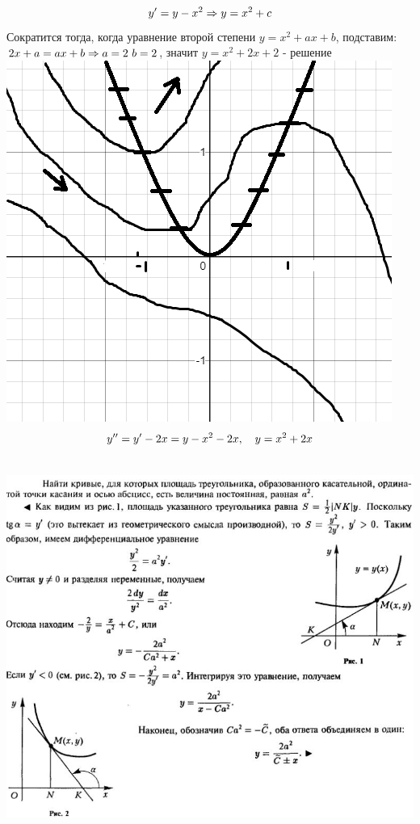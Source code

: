 \documentclass[12pt, fleqn]{article}
\begin{document}
    \begin{example}
        \[y'=y-x^2 \Rightarrow y=x^2+c\]
        Сократится тогда, когда уравнение второй степени $y=x^2+ax+b$, подставим: $2x+a=ax+b \Rightarrow a=2 \ b=2$, значит $y=x^2+2x+2$ - решение\\
        \includegraphics[scale=0.3]{pics/resh5.png}
        \[y''=y'-2x=y-x^2-2x,\quad y=x^2+2x\]
    \end{example}

    \begin{example}\ \\
        \includegraphics[scale=0.7]{pics/z71.jpg}
    \end{example}
\end{document}
